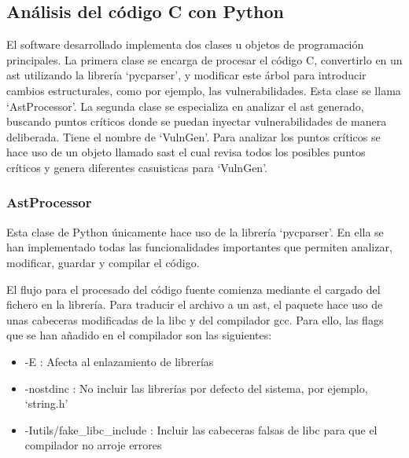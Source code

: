 \subsection{Análisis del código C con Python}
El software desarrollado implementa dos clases u objetos de programación principales.
La primera clase se encarga de procesar el código C, convertirlo en un \acrshort{ast} utilizando la librería `pycparser', y modificar este árbol para introducir cambios estructurales, como por ejemplo, las vulnerabilidades.
Esta clase se llama `AstProcessor'.
La segunda clase se especializa en analizar el \acrshort{ast} generado, buscando puntos críticos donde se puedan inyectar vulnerabilidades de manera deliberada.
Tiene el nombre de `VulnGen'.
Para analizar los puntos críticos se hace uso de un objeto llamado \acrshort{sast} el cual revisa todos los posibles puntos críticos y genera diferentes casuisticas para `VulnGen'.

\subsubsection{AstProcessor} \label{subsub:astproc}
Esta clase de Python únicamente hace uso de la librería `pycparser'. En ella se han implementado todas las funcionalidades importantes que permiten analizar, modificar, guardar y compilar el código.

El flujo para el procesado del código fuente comienza mediante el cargado del fichero en la librería. Para traducir el archivo a un \acrshort{ast}, el paquete hace uso de unas cabeceras modificadas de la \acrfull{libc} y del compilador \acrfull{gcc}. Para ello, las flags que se han añadido en el compilador son las siguientes:
\begin{itemize}
    \item -E : Afecta al enlazamiento de librerías
    \item -nostdinc : No incluir las librerías por defecto del sistema, por ejemplo, `string.h'
    \item -Iutils/fake\_libc\_include : Incluir las cabeceras falsas de libc para que el compilador no arroje errores
\end{itemize}


